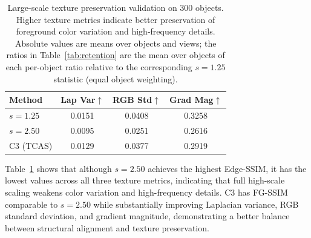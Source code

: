 \documentclass[times,twocolumn,final]{elsarticle}
\providecommand{\DIFadd}[1]{{\protect\color{red} \sf #1}} %
\providecommand{\DIFdel}[1]{{\protect\color{red} \scriptsize #1}} %
\providecommand{\DIFaddFL}[1]{\DIFadd{#1}} %
\providecommand{\DIFdelFL}[1]{\DIFdel{#1}} %
\providecommand{\DIFaddbeginFL}{} %
\providecommand{\DIFaddendFL}{} %
\providecommand{\DIFdelbeginFL}{} %
\providecommand{\DIFdelendFL}{} %
\newcommand{\DIFscaledelfig}{0.5}
\newlength{\DIFdelgraphicswidth} %
\newlength{\DIFdelgraphicsheight} %
\newcommand{\DIFaddincludegraphics}[2][]{{\color{red}\fbox{\DIFOincludegraphics[#1]{#2}}}} %
\newcommand{\DIFdelincludegraphics}[2][]{%
\sbox{\DIFdelgraphicsbox}{\DIFOincludegraphics[#1]{#2}}%
\settoboxwidth{\DIFdelgraphicswidth}{\DIFdelgraphicsbox} %
\settoboxtotalheight{\DIFdelgraphicsheight}{\DIFdelgraphicsbox} %
\scalebox{\DIFscaledelfig}{%
\parbox[b]{\DIFdelgraphicswidth}{\usebox{\DIFdelgraphicsbox}\\[-\baselineskip] \rule{\DIFdelgraphicswidth}{0em}}\llap{\resizebox{\DIFdelgraphicswidth}{\DIFdelgraphicsheight}{%
\setlength{\unitlength}{\DIFdelgraphicswidth}%
\begin{picture}(1,1)%
\thicklines\linethickness{2pt} %
{\color[rgb]{1,0,0}\put(0,0){\framebox(1,1){}}}%
{\color[rgb]{1,0,0}\put(0,0){\line( 1,1){1}}}%
{\color[rgb]{1,0,0}\put(0,1){\line(1,-1){1}}}%
\end{picture}%
}\hspace*{3pt}}} %
} %
\DeclareRobustCommand{\DIFaddbeginFL}{\DIFOaddbeginFL \let\includegraphics\DIFaddincludegraphics} %
\DeclareRobustCommand{\DIFaddendFL}{\DIFOaddendFL \let\includegraphics\DIFOincludegraphics} %
\DeclareRobustCommand{\DIFdelbeginFL}{\DIFOdelbeginFL \let\includegraphics\DIFdelincludegraphics} %
\DeclareRobustCommand{\DIFdelendFL}{\DIFOaddendFL \let\includegraphics\DIFOincludegraphics} %
\begin{document}
\begin{table}[t]
\centering
\caption{Large-scale texture preservation validation on 300 objects. Higher texture metrics indicate better preservation of foreground color variation and high-frequency details. \DIFaddbeginFL \DIFaddFL{Absolute values are means over objects and views; the ratios in Table~\ref{tab:retention} are the mean over objects of each per-object ratio relative to the corresponding $s = 1.25$ statistic (equal object weighting).}\DIFaddendFL }
\label{tab:texture300}
\small
\begin{tabular}{lccc}
\toprule
Method & Lap Var$\uparrow$ & RGB Std$\uparrow$ & Grad Mag$\uparrow$ \\
\midrule
$s = 1.25$ & 0.0151 & 0.0408 & 0.3258 \\
$s = 2.50$ & 0.0095 & 0.0251 & 0.2616 \\
C3 (TCAS) & 0.0129 & 0.0377 & 0.2919 \\
\bottomrule
\end{tabular}
\end{table}

Table~\ref{tab:texture300} shows that although $s = 2.50$ achieves the highest Edge-SSIM, it has the lowest values across all three texture metrics, indicating that full high-scale scaling weakens color variation and high-frequency details. C3 has FG-SSIM comparable to $s = 2.50$ while substantially improving Laplacian variance, RGB standard deviation, and gradient magnitude, demonstrating a better balance between structural alignment and texture preservation.


\begin{table}[t]
\centering
\caption{Texture retention ratios and object-level stability of C3. \DIFdelbeginFL \DIFdelFL{Texture ratios are measured relative }\DIFdelendFL \DIFaddbeginFL \DIFaddFL{Each ratio is the mean over objects of the per-object ratio of the corresponding foreground statistic }\DIFaddendFL to \DIFaddbeginFL \DIFaddFL{that of }\DIFaddendFL $s = 1.25$ \DIFaddbeginFL \DIFaddFL{(equal object weighting)}\DIFaddendFL ; object-level win rates and confidence intervals for C3 over $s = 2.50$ are reported in the text.}
\label{tab:retention}
\end{table}
\end{document}

